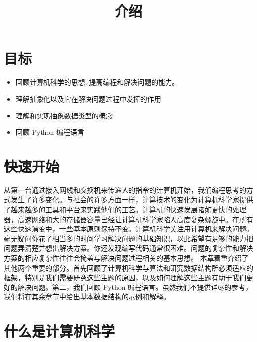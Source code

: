 \documentclass[10pt,a4paper]{article}
\begin{document}
\title{介绍}
\maketitle

\section{目标}
\begin{itemize}
\item 回顾计算机科学的思想, 提高编程和解决问题的能力。
\item 理解抽象化以及它在解决问题过程中发挥的作用
\item 理解和实现抽象数据类型的概念
\item 回顾 Python 编程语言
\end{itemize}

\section{快速开始}

从第一台通过接入网线和交换机来传递人的指令的计算机开始，我们编程思考的方式发生了许多变化。与社会的许多方面一样，计算技术的变化为计算机科学家提供了越来越多的工具和平台来实践他们的工艺。计算机的快速发展诸如更快的处理器，高速网络和大的存储器容量已经让计算机科学家陷入高度复杂螺旋中。在所有这些快速演变中，一些基本原则保持不变。计算机科学关注用计算机来解决问题。
毫无疑问你花了相当多的时间学习解决问题的基础知识，以此希望有足够的能力把问题弄清楚并想出解决方案。你还发现编写代码通常很困难。问题的复杂性和解决方案的相应复杂性往往会掩盖与解决问题过程相关的基本思想。
本章着重介绍了其他两个重要的部分。首先回顾了计算机科学与算法和研究数据结构所必须适应的框架，特别是我们需要研究这些主题的原因，以及如何理解这些主题有助于我们更好的解决问题。第二，我们回顾 Python 编程语言。虽然我们不提供详尽的参考，我们将在其余章节中给出基本数据结构的示例和解释。 


\section{什么是计算机科学}
\end{document}
